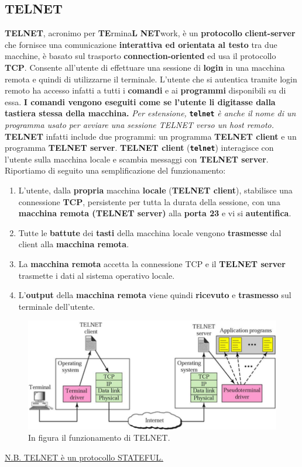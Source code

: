 \documentclass[11pt,a4paper,oneside]{book}
\theoremstyle{definition}
\begin{document}
\subsection{TELNET}
\textbf{TELNET}, acronimo per \textbf{TE}rmina\textbf{L} \textbf{NET}work, è un \textbf{protocollo} \textbf{client-server} che fornisce una comunicazione \textbf{interattiva ed orientata al testo} tra due macchine, è basato sul trasporto \textbf{connection-oriented} ed usa il protocollo \textbf{TCP}.
Consente all'utente di effettuare una sessione di \textbf{login} in una macchina remota e quindi di utilizzarne il terminale. L'utente che si autentica tramite login remoto ha accesso infatti a tutti i \textbf{comandi} e ai \textbf{programmi} disponibili su di essa. \textbf{I comandi vengono eseguiti come se l'utente li digitasse dalla tastiera stessa della macchina.} \textit{Per estensione,} \texttt{\textbf{telnet}} \textit{è anche il nome di un programma usato per avviare una sessione TELNET verso un host remoto.}
\textbf{TELNET} infatti include due programmi: un programma \textbf{TELNET client} e un programma \textbf{TELNET server}. \textbf{TELNET client} (\texttt{\textbf{telnet}}) interagisce con l'utente sulla macchina locale e scambia messaggi con \textbf{TELNET server}. Riportiamo di seguito una semplificazione del funzionamento:
\begin{enumerate}
	\item L'utente, dalla \textbf{propria} macchina \textbf{locale} (\textbf{\textbf{TELNET client}}), stabilisce una connessione \textbf{TCP}, persistente per tutta la durata della sessione, con una \textbf{macchina remota (\textbf{TELNET server})} alla \textbf{porta 23} e vi si \textbf{autentifica}.
	\item  Tutte le \textbf{battute} dei \textbf{tasti} della macchina locale vengono \textbf{trasmesse} dal client
	      alla \textbf{macchina remota}.
	\item La \textbf{macchina remota} accetta la connessione TCP e il \textbf{TELNET server} trasmette i dati al sistema operativo locale.
	\item L'\textbf{output} della \textbf{macchina remota} viene quindi \textbf{ricevuto} e \textbf{trasmesso} sul terminale dell'utente.
\end{enumerate}
\begin{figure}[!h]
	\includegraphics[scale=0.8]{Immagini/TELNET.png}
	\centering
	\caption{In figura il funzionamento di TELNET.}
\end{figure}
\underline{N.B. TELNET è un protocollo STATEFUL.}
\end{document}
